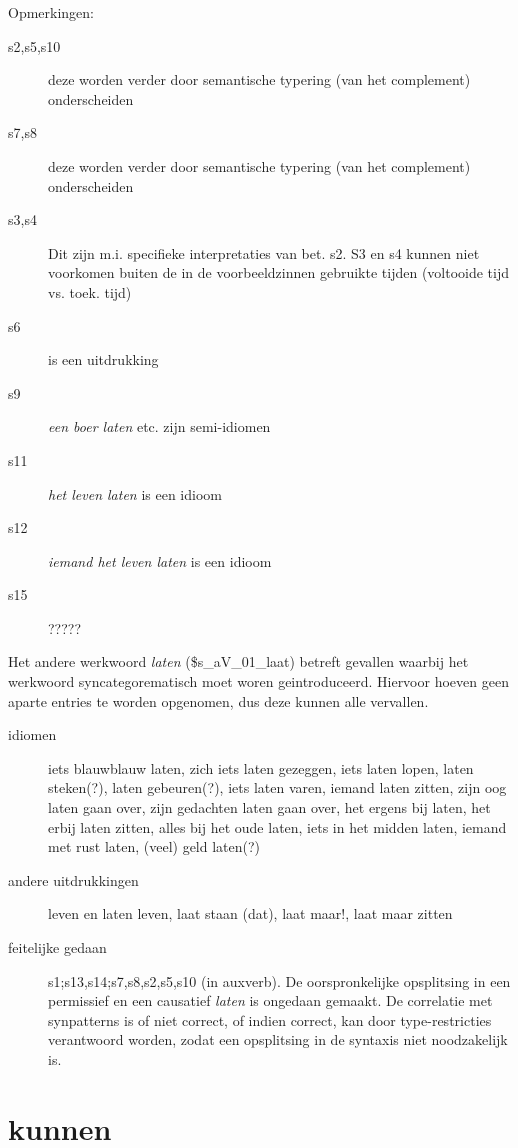 Opmerkingen:
\begin{description}
  \item[s2,s5,s10] deze worden verder door semantische typering (van het
complement) onderscheiden
  \item[s7,s8] deze worden verder door semantische typering (van het
complement) onderscheiden
  \item[s3,s4] Dit zijn m.i. specifieke interpretaties van bet. s2. S3 en s4
kunnen niet voorkomen buiten de in de voorbeeldzinnen gebruikte tijden
(voltooide tijd vs. toek. tijd)
  \item[s6] is een uitdrukking
  \item[s9] {\em een boer laten} etc. zijn semi-idiomen
  \item[s11] {\em  het leven laten} is een idioom
  \item[s12] {\em iemand het leven laten} is een idioom
  \item[s15] ?????
\end{description}

Het andere werkwoord {\em  laten} (\$s\_aV\_01\_laat) betreft gevallen waarbij het
werkwoord syncategorematisch moet woren geintroduceerd. Hiervoor hoeven geen
aparte entries te worden opgenomen, dus deze kunnen alle vervallen.

\begin{description}
  \item[idiomen]  iets blauwblauw laten, zich iets laten gezeggen, iets laten
lopen, laten steken(?), laten gebeuren(?), iets laten varen, iemand laten
zitten, zijn oog laten gaan over, zijn gedachten laten gaan over, het ergens
bij laten, het erbij laten zitten, alles bij het oude laten, iets in het midden
laten, iemand met rust laten, (veel) geld laten(?)
  \item[andere uitdrukkingen] leven en laten leven, laat staan (dat), laat
maar!, laat maar zitten
\end{description}

\begin{description}
\item[feitelijke gedaan] s1;s13,s14;s7,s8,s2,s5,s10 (in auxverb). De
oorspronkelijke opsplitsing in een permissief en een causatief {\em laten} is
ongedaan gemaakt. De correlatie met synpatterns is of niet correct, of indien
correct, kan door type-restricties verantwoord worden, zodat een opsplitsing
in de syntaxis niet noodzakelijk is.
\end{description}


\newpage
\section{kunnen}

